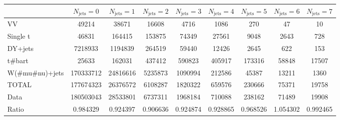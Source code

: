 \footnotesize{
\begin{tabular}{l|cccccccc} 
  &  $N_{\text{jets}} = 0 $ & $N_{\text{jets}} = 1 $ & $N_{\text{jets}} = 2 $ & $N_{\text{jets}} = 3 $ & $N_{\text{jets}} = 4 $ & $N_{\text{jets}} = 5 $ & $N_{\text{jets}} = 6 $ & $N_{\text{jets}} = 7$ \\ \hline 
   VV        & 49214 & 38671 & 16608 & 4716 & 1086 & 270 & 47 & 10 \\ 
   Single t        & 46831 & 164415 & 153875 & 74349 & 27561 & 9048 & 2643 & 728 \\ 
   DY+jets        & 7218933 & 1194839 & 264519 & 59440 & 12426 & 2645 & 622 & 153 \\ 
   t#bar{t}        & 25633 & 162031 & 437412 & 590823 & 405917 & 173316 & 58848 & 17507 \\ 
   W(#mu#nu)+jets        & 170333712 & 24816616 & 5235873 & 1090994 & 212586 & 45387 & 13211 & 1360 \\ 
 \hline 
 TOTAL & 177674323 & 26376572 & 6108287 & 1820322 & 659576 & 230666 & 75371 & 19758 \\ 
 \hline 
 Data          & 180503043 & 28533801 & 6737311 & 1968184 & 710088 & 238162 & 71489 & 19908 \\ 
  Ratio          & 0.984329 & 0.924397 & 0.906636 & 0.924874 & 0.928865 & 0.968526 & 1.054302 & 0.992465 \\ 
 \end{tabular}}